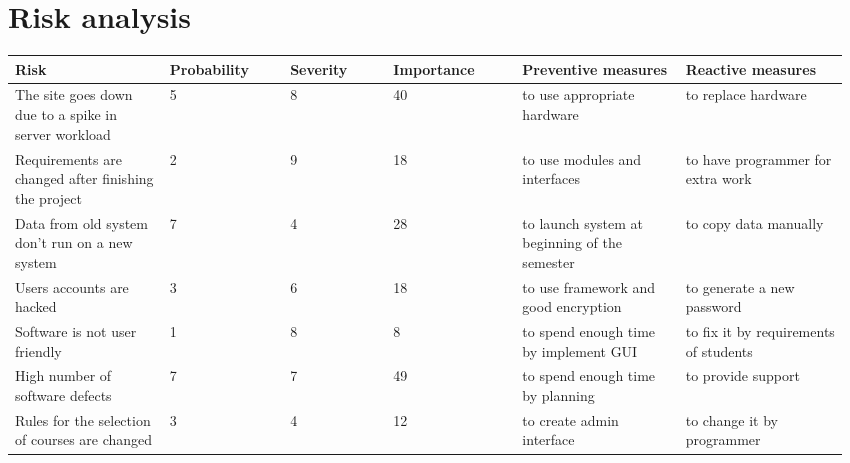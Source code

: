 \section{Risk analysis}
\par
\begin{tabular}{|p{0.18\linewidth} |p{0.14\linewidth}| p{0.12\linewidth}| p{0.15\linewidth}| p{0.19\linewidth}| p{0.19\linewidth}|}
\hline
 \textbf{Risk} & \textbf{Probability}                          & \textbf{Severity}                           & \textbf{Importance}                             & \textbf{Preventive measures}                & \textbf{Reactive measures}                   \\ 
   \hline
 The site goes down due to a spike in server workload & 5                              & 8                            & 40                             & to use appropriate hardware                  & to replace hardware                   \\
 \hline
Requirements are changed after finishing the project & 2                              & 9                            & 18                             & to use modules and interfaces                & to have programmer for extra work     \\
\hline
Data from old system don't run on a new system       & 7                              & 4                            & 28                             & to launch system at beginning of the semester & to copy data manually                 \\
\hline
Users accounts are hacked                            & 3                              & 6                            & 18                             & to use framework and good encryption         & to generate a new password            \\
\hline
Software is not user friendly                        & 1                              & 8                            & 8                              & to spend enough time by implement GUI        & to fix it by requirements of students \\
\hline
High number of software defects                      & 7                              & 7                            & 49                             & to spend enough time by planning             & to provide support                    \\
\hline
Rules for the selection of courses are changed       & 3                              & 4                            & 12                             & to create admin interface                    & to change it by programmer  \\ 
\hline
\end{tabular}